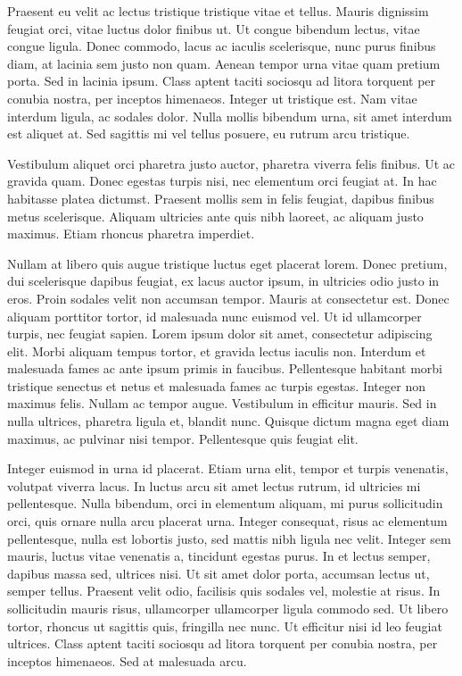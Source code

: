 Praesent eu velit ac lectus tristique tristique vitae et tellus. Mauris dignissim feugiat orci, vitae luctus dolor finibus ut. Ut congue bibendum lectus, vitae congue ligula. Donec commodo, lacus ac iaculis scelerisque, nunc purus finibus diam, at lacinia sem justo non quam. Aenean tempor urna vitae quam pretium porta. Sed in lacinia ipsum. Class aptent taciti sociosqu ad litora torquent per conubia nostra, per inceptos himenaeos. Integer ut tristique est. Nam vitae interdum ligula, ac sodales dolor. Nulla mollis bibendum urna, sit amet interdum est aliquet at. Sed sagittis mi vel tellus posuere, eu rutrum arcu tristique.

Vestibulum aliquet orci pharetra justo auctor, pharetra viverra felis finibus. Ut ac gravida quam. Donec egestas turpis nisi, nec elementum orci feugiat at. In hac habitasse platea dictumst. Praesent mollis sem in felis feugiat, dapibus finibus metus scelerisque. Aliquam ultricies ante quis nibh laoreet, ac aliquam justo maximus. Etiam rhoncus pharetra imperdiet.

Nullam at libero quis augue tristique luctus eget placerat lorem. Donec pretium, dui scelerisque dapibus feugiat, ex lacus auctor ipsum, in ultricies odio justo in eros. Proin sodales velit non accumsan tempor. Mauris at consectetur est. Donec aliquam porttitor tortor, id malesuada nunc euismod vel. Ut id ullamcorper turpis, nec feugiat sapien. Lorem ipsum dolor sit amet, consectetur adipiscing elit. Morbi aliquam tempus tortor, et gravida lectus iaculis non. Interdum et malesuada fames ac ante ipsum primis in faucibus. Pellentesque habitant morbi tristique senectus et netus et malesuada fames ac turpis egestas. Integer non maximus felis. Nullam ac tempor augue. Vestibulum in efficitur mauris. Sed in nulla ultrices, pharetra ligula et, blandit nunc. Quisque dictum magna eget diam maximus, ac pulvinar nisi tempor. Pellentesque quis feugiat elit.

Integer euismod in urna id placerat. Etiam urna elit, tempor et turpis venenatis, volutpat viverra lacus. In luctus arcu sit amet lectus rutrum, id ultricies mi pellentesque. Nulla bibendum, orci in elementum aliquam, mi purus sollicitudin orci, quis ornare nulla arcu placerat urna. Integer consequat, risus ac elementum pellentesque, nulla est lobortis justo, sed mattis nibh ligula nec velit. Integer sem mauris, luctus vitae venenatis a, tincidunt egestas purus. In et lectus semper, dapibus massa sed, ultrices nisi. Ut sit amet dolor porta, accumsan lectus ut, semper tellus. Praesent velit odio, facilisis quis sodales vel, molestie at risus. In sollicitudin mauris risus, ullamcorper ullamcorper ligula commodo sed. Ut libero tortor, rhoncus ut sagittis quis, fringilla nec nunc. Ut efficitur nisi id leo feugiat ultrices. Class aptent taciti sociosqu ad litora torquent per conubia nostra, per inceptos himenaeos. Sed at malesuada arcu.

